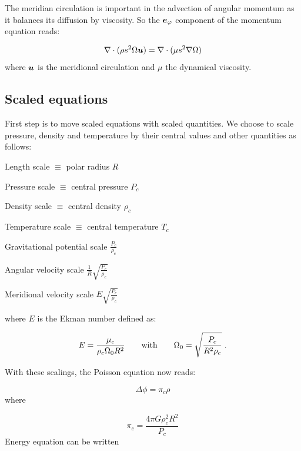 The meridian circulation is important in the advection of angular
momentum as it balances its diffusion by viscosity. So the $\ephi$
component of the momentum equation reads:

\begin{equation}
\label{eq:angular_mom}
\na\cdot{(\rho s^2\Omega\vu)}=\na\cdot (\mu s^2\na\Omega)
\end{equation}
where $\vu$ is the meridional circulation and $\mu$ the dynamical
viscosity.


\subsection{Scaled equations}

First step is to move scaled equations with scaled quantities. We choose
to scale pressure, density and temperature by their central values and
other quantities as follows:

\begin{center}\parbox{10cm}{

Length scale $\equiv$ polar radius \dotfill $R$

Pressure scale $\equiv$ central pressure \dotfill $P_c$

Density scale $\equiv$ central density \dotfill $\rho_c$

Temperature scale $\equiv$ central temperature \dotfill $T_c$

Gravitational potential scale \dotfill  $\frac{P_c}{\rho_c}$

Angular velocity scale \dotfill $\frac{1}{R}\sqrt{\frac{P_c}{\rho_c}}$

Meridional velocity scale \dotfill $E\sqrt{\frac{P_c}{\rho_c}}$
}
\end{center}\bigskip

\noindent where $E$ is the Ekman number defined as:

\begin{equation} E = \frac{\mu_c}{\rho_c \Omega_0 R^2} {\qquad {\rm with}\qquad}
\Omega_0=\sqrt{\frac{P_c}{R^2\rho_c}}\; .\end{equation}

With these scalings, the Poisson equation now reads:

\begin{equation} \Delta\phi = \pi_c \rho\end{equation}
where

\begin{equation} \pi_c = \frac{4\pi G\rho_c^2 R^2}{P_c}\label{picdef}\end{equation}
Energy equation can be written


